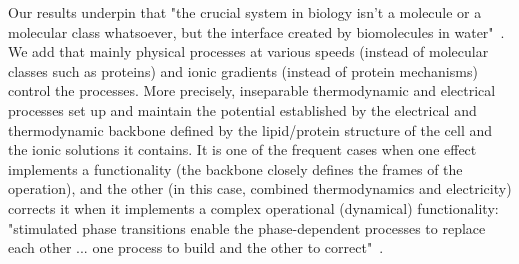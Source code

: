 Our results underpin that "the crucial system in biology isn't a molecule or a molecular class whatsoever, but the interface created by biomolecules in water"~\cite{LivingSystemPhysics:2021}. We add that mainly
physical processes at various speeds (instead of molecular classes such as proteins) and ionic gradients (instead of protein mechanisms) control the processes.
More precisely, inseparable thermodynamic and electrical processes set up and maintain the potential established by the electrical and thermodynamic backbone defined by the lipid/protein structure of the cell and the ionic solutions it contains. It is one of the frequent cases when 
one effect implements a functionality (the backbone closely defines the frames of the operation), and the other (in this case, combined thermodynamics and electricity) corrects it when it implements a complex operational (dynamical) functionality:
"stimulated phase transitions enable the phase-dependent processes to replace each other ... one process to build and the other
to correct"~\cite{BiologicalConservationLaw:2017}.

